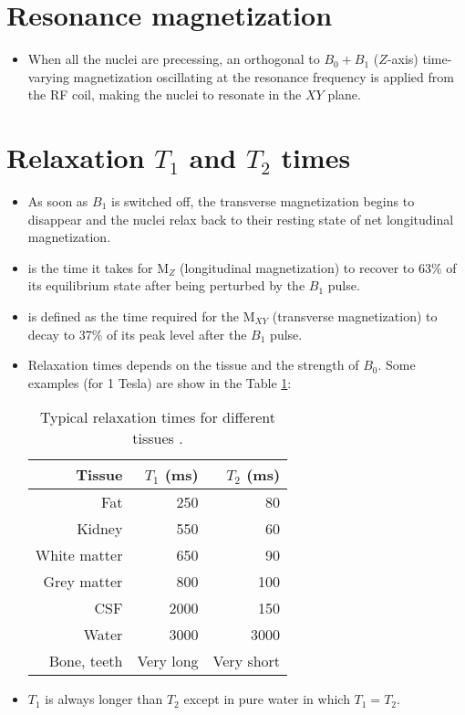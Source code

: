 \section{Resonance magnetization}
\begin{itemize}
\item When all the nuclei are precessing, an orthogonal to $B_0+B_1$
  ($Z$-axis) time-varying magnetization oscillating at the resonance
  frequency is applied from the RF coil, making the nuclei to resonate
  in the $XY$ plane.
\end{itemize}

\section{Relaxation $T_1$ and $T_2$ times}
\begin{itemize}
\item As soon as $B_1$ is switched off, the transverse magnetization
  begins to disappear and the nuclei relax back to their resting state
  of net longitudinal magnetization. 
\item {} is the time it takes for M$_Z$ (longitudinal
  magnetization) to recover to 63\% of its equilibrium state after
  being perturbed by the $B_1$ pulse.
\item {} is
  defined as the time required for the M$_{XY}$ (transverse magnetization) to
  decay to 37\% of its peak level after the $B_1$ pulse.
\end{itemize}

\begin{itemize}
\item Relaxation times depends on the tissue and the strength of
  $B_0$. Some examples (for 1 Tesla) are show in the Table \ref{tab:relaxation_times}:
  \begin{table}
    \begin{center}
      \begin{tabular}{r|rr}
        Tissue & $T_1$ (ms) & $T_2$ (ms) \\
        \hline
        Fat & 250 & 80 \\
        Kidney & 550 &  60 \\
        White matter & 650 & 90 \\
        Grey matter & 800 & 100 \\
        CSF & 2000 & 150 \\
        Water & 3000 & 3000 \\
        Bone, teeth & Very long & Very short
      \end{tabular}
      \caption{Typical relaxation times for different tissues
        \cite{abdulla2025MRI_T1T2}.}
      \label{tab:relaxation_times}
    \end{center}
  \end{table}
\item $T_1$ is always longer than $T_2$ except in pure water in which
  $T_1=T_2$.
\end{itemize}

